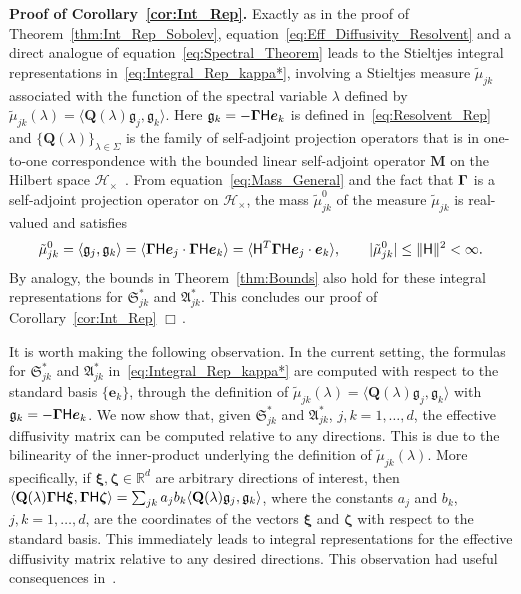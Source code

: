 \documentclass[english,12pt,jmp,graphicx]{revtex4-1}
\newcommand{\vecxi}{\boldsymbol{\xi}}
\newcommand{\veczeta}{\boldsymbol{\zeta}}
\newcommand{\vecg}{\mathfrak{g}}
\newcommand{\vece}{\boldsymbol{e}}
\newcommand{\thmref}[1]{Theorem~\ref{#1}}
\newcommand{\corref}[1]{Corollary~\ref{#1}}
\newcommand{\bGamma}{\mbox{\boldmath${\Gamma}$}}
\newcommand{\Sg}{\mathfrak{S}}
\newcommand{\Ag}{\mathfrak{A}}
\newcommand{\Hc}{\mathcal{H}}
\renewcommand{\d}{\mathrm{d}}
\newcommand{\Hm}{\mathsf{H}}
\newcommand{\Mb}{\mathbf{M}}
\newcommand{\Qb}{\mathbf{Q}}
\begin{document}
\noindent
\textbf{Proof of \corref{cor:Int_Rep}.}
Exactly as in the proof of \thmref{thm:Int_Rep_Sobolev},
equation~\eqref{eq:Eff_Diffusivity_Resolvent} and a direct analogue  
of equation~\eqref{eq:Spectral_Theorem}  
leads to the Stieltjes integral representations
in~\eqref{eq:Integral_Rep_kappa*}, involving a Stieltjes measure
$\tilde{\mu}_{jk}$ associated with the function of the spectral variable
$\lambda$ defined by $\tilde{\mu}_{jk}(\lambda)=\langle
\Qb(\lambda)\vecg_j,\vecg_k\rangle$. Here
$\vecg_k=-\bGamma\Hm\vece_k$
is defined in~\eqref{eq:Resolvent_Rep} and
$\{\Qb(\lambda)\}_{\lambda\in\Sigma}$ is the family of self-adjoint
projection operators that is in one-to-one correspondence with the
bounded linear self-adjoint operator $\Mb$ on the Hilbert space
$\Hc_{\times}$~\cite{Stone:64,Reed-1980}.
From equation~\eqref{eq:Mass_General} and the fact 
that $\bGamma$ 
is a self-adjoint projection operator on $\Hc_\times$,
the mass $\tilde{\mu}^0_{jk}$ of the measure $\tilde{\mu}_{jk}$ is real-valued and satisfies 
%
\begin{align}\label{eq:Mass}
  \tilde{\mu}^0_{jk}%
        =\langle \vecg_j, \vecg_k\rangle
        =\langle\bGamma\Hm \vece_j\cdot\bGamma\Hm \vece_k\rangle 
        =\langle\Hm^T\bGamma\Hm\vece_j\cdot\vece_k\rangle,
        \qquad
        |\tilde{\mu}^0_{jk}|\leq\|\Hm\|^2<\infty.
\end{align}
%
By analogy, the bounds in \thmref{thm:Bounds} also hold for these
integral representations for $\Sg^*_{jk}$ and $\Ag^*_{jk}$.
This concludes our proof of 
\corref{cor:Int_Rep} $\Box\,.$




It is worth making the following observation. In the current 
setting, the formulas for $\Sg^*_{jk}$ and $\Ag^*_{jk}$ 
in~\eqref{eq:Integral_Rep_kappa*} are computed with respect to the
standard basis $\{\vece_k\}$, through the definition of
$\tilde{\mu}_{jk}(\lambda)=\langle\Qb(\lambda)\vecg_j,\vecg_k\rangle$ with
$\vecg_k=-\bGamma\Hm\vece_k$. We now show that, given $\Sg^*_{jk}$  
and $\Ag^*_{jk}$, $j,k=1,\ldots,d$, the effective diffusivity matrix can
be computed relative to any directions. This is due to the bilinearity  
of the inner-product underlying the definition of $\tilde{\mu}_{jk}(\lambda)$. More
specifically, if $\vecxi,\veczeta\in\mathbb{R}^d$ are  
arbitrary directions of interest, then
$\langle\Qb(\lambda)\bGamma\Hm\vecxi,\bGamma\Hm\veczeta\rangle
=\sum_{jk}a_jb_k\langle\Qb(\lambda)\vecg_j,\vecg_k\rangle$, where the constants 
$a_j$ and $b_k$, $j,k=1,\ldots,d$, are the coordinates of the vectors
$\vecxi$ and $\veczeta$ with respect to the standard
basis. This immediately leads to integral representations for the
effective diffusivity matrix relative to any desired directions. This
observation had useful consequences
in~\cite{Fannjiang:1994:SIAM_JAM:333,Fannjiang:1997:1033}. 
\end{document}
